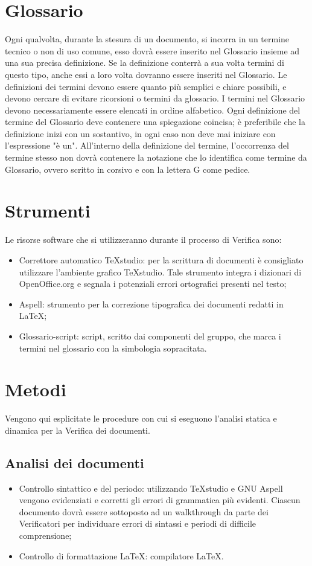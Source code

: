\newpage
\section{Glossario}
\label{9.0}
Ogni qualvolta, durante la stesura di un documento, si incorra in un termine tecnico o non di uso comune, esso dovrà essere inserito nel Glossario insieme ad una sua precisa definizione. Se la definizione conterrà a sua volta termini di questo tipo, anche essi a loro volta dovranno essere inseriti nel Glossario.
Le definizioni dei termini devono essere quanto più semplici e chiare possibili, e devono cercare di evitare ricorsioni o termini da glossario.
I termini nel Glossario devono necessariamente essere elencati in ordine alfabetico.
Ogni definizione del termine del Glossario deve contenere una spiegazione coincisa; è preferibile che la definizione inizi con un sostantivo, in ogni caso non deve mai iniziare con l'espressione "è un". 
All'interno della definizione del termine, l'occorrenza del termine stesso non dovrà contenere la notazione che lo identifica come termine da Glossario, ovvero scritto in corsivo e con la lettera G come pedice.

\newpage
\section{Strumenti}
\label{10.0}
Le risorse software che si utilizzeranno durante il processo di Verifica sono:
\begin{itemize}
\item Correttore automatico TeXstudio: per la scrittura di documenti è consigliato utilizzare l'ambiente grafico TeXstudio. Tale strumento integra i dizionari di OpenOffice.org e segnala i potenziali errori ortografici presenti nel testo;
\item Aspell: strumento per la correzione tipografica dei documenti redatti in \LaTeX ;
\item Glossario-script: script, scritto dai componenti del gruppo, che marca i termini nel glossario con la simbologia sopracitata.
\end{itemize}

\newpage
\section{Metodi}
\label{11.0}
Vengono qui esplicitate le procedure con cui si eseguono l'analisi statica e dinamica per la Verifica dei documenti.

\subsection{Analisi dei documenti}
\label{11.1}
\begin{itemize}
\item Controllo sintattico e del periodo:
utilizzando TeXstudio e GNU Aspell vengono evidenziati e corretti gli errori di
grammatica più evidenti. Ciascun documento dovrà essere sottoposto ad un walkthrough da parte dei Verificatori per individuare errori di sintassi e periodi di difficile comprensione;
\item Controllo di formattazione \LaTeX:
compilatore \LaTeX. 
\end{itemize}

